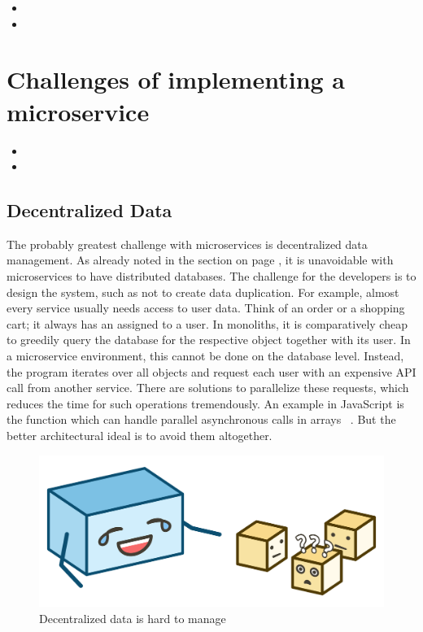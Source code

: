 \begin{itemize}
  \item {}
  \item {}
\end{itemize}


\section{Challenges of implementing a microservice}

\begin{itemize}
  \item {}
  \item {}
\end{itemize}


\subsection{Decentralized Data}

The probably greatest challenge with microservices is decentralized data management. As already noted in the section on page \pageref{sec:theory:decentralized-data}, it is unavoidable with microservices to have distributed databases. The challenge for the developers is to design the system, such as not to create data duplication. For example, almost every service usually needs access to user data. Think of an order or a shopping cart; it always has an assigned to a user. In monoliths, it is comparatively cheap to greedily query the database for the respective object together with its user. In a microservice environment, this cannot be done on the database level. Instead, the program iterates over all objects and request each user with an expensive API call from another service. There are solutions to parallelize these requests, which reduces the time for such operations tremendously. An example in JavaScript is the  function which can handle parallel asynchronous calls in arrays ~\cite{mdn.2020}. But the better architectural ideal is to avoid them altogether.

\begin{figure}[ht]
  \centering
  \includegraphics[width=0.55\linewidth]{assets/illustration-decentralized-data.png}
  \caption{Decentralized data is hard to manage}
\end{figure}

